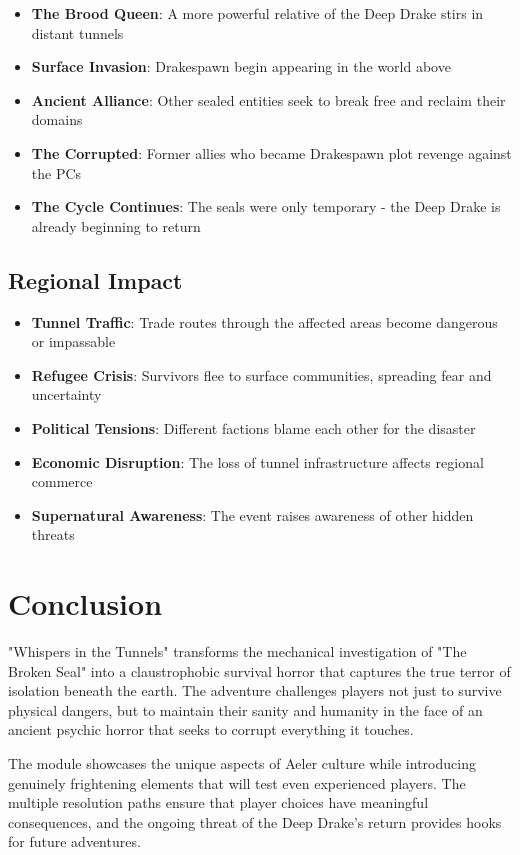 \documentclass[11pt]{article}
\begin{document}
\begin{itemize}
\item \textbf{The Brood Queen}: A more powerful relative of the Deep Drake stirs in distant tunnels
\item \textbf{Surface Invasion}: Drakespawn begin appearing in the world above
\item \textbf{Ancient Alliance}: Other sealed entities seek to break free and reclaim their domains
\item \textbf{The Corrupted}: Former allies who became Drakespawn plot revenge against the PCs
\item \textbf{The Cycle Continues}: The seals were only temporary - the Deep Drake is already beginning to return
\end{itemize}

\subsection{Regional Impact}

\begin{itemize}
\item \textbf{Tunnel Traffic}: Trade routes through the affected areas become dangerous or impassable
\item \textbf{Refugee Crisis}: Survivors flee to surface communities, spreading fear and uncertainty
\item \textbf{Political Tensions}: Different factions blame each other for the disaster
\item \textbf{Economic Disruption}: The loss of tunnel infrastructure affects regional commerce
\item \textbf{Supernatural Awareness}: The event raises awareness of other hidden threats
\end{itemize}

\section{Conclusion}

"Whispers in the Tunnels" transforms the mechanical investigation of "The Broken Seal" into a claustrophobic survival horror that captures the true terror of isolation beneath the earth. The adventure challenges players not just to survive physical dangers, but to maintain their sanity and humanity in the face of an ancient psychic horror that seeks to corrupt everything it touches.

The module showcases the unique aspects of Aeler culture while introducing genuinely frightening elements that will test even experienced players. The multiple resolution paths ensure that player choices have meaningful consequences, and the ongoing threat of the Deep Drake's return provides hooks for future adventures.
\end{document}
